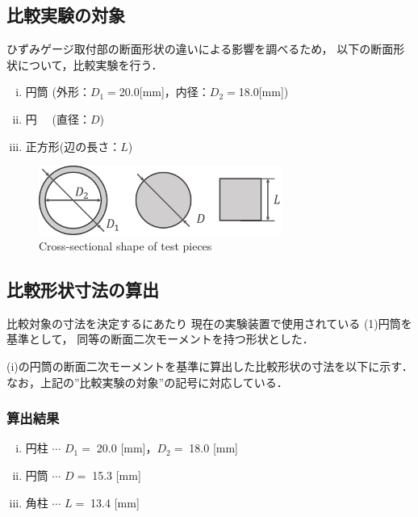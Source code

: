 \documentclass[twocolumn,a4j]{jsarticle}
\begin{document}
\subsection{比較実験の対象}
ひずみゲージ取付部の断面形状の違いによる影響を調べるため，
以下の断面形状について，比較実験を行う．\par
\begin{enumerate}[(i)]
    \item 円筒  (外形：$D_1=$20.0[mm]，内径：$D_2=$18.0[mm])
    \item 円　  (直径：$D$)
    \item 正方形(辺の長さ：$L$)
\end{enumerate}
\begin{figure}[htbp]
    \footnotesize
    \begin{center}
        \includegraphics[width=80mm]{../images/testpieces_2.png}
        \caption{Cross-sectional shape of test pieces}
    \end{center}
\end{figure}

\newpage

\subsection{比較形状寸法の算出}
比較対象の寸法を決定するにあたり
現在の実験装置で使用されている (1)円筒を基準として，
同等の断面二次モーメントを持つ形状とした．\par
(i)の円筒の断面二次モーメントを基準に算出した比較形状の寸法を以下に示す．
なお，上記の”比較実験の対象”の記号に対応している．\\

\subsubsection{算出結果}
\begin{screen}
    \begin{enumerate}[(i)]
        \item 円柱 $\cdots$ $D_1=\;$20.0 [mm]，$D_2=\;$18.0 [mm]
        \item 円筒 $\cdots$ $D=\;$15.3 [mm]
        \item 角柱 $\cdots$ $L=\;$13.4 [mm]
    \end{enumerate}
\end{screen}
\end{document}
